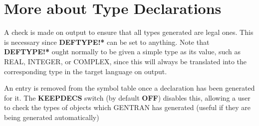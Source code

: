 \section{More about Type Declarations}
\label{more:type}
A check is made on output to ensure that all types generated are legal ones.
This is necessary since {\bf DEFTYPE!*} can be set to anything.
Note that {\bf DEFTYPE!*} ought normally to be given a simple 
type as its
value, such as REAL, INTEGER, or COMPLEX,
since this will always be translated into the corresponding type in the
target language on output.

An entry is removed from the symbol table once
a declaration has been generated for it.  The {\bf KEEPDECS} switch (by
default {\bf OFF}) disables this, allowing a user to check the types of objects
which GENTRAN has generated (useful if they are being generated automatically)

